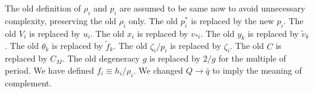 \documentclass{article}
\begin{document}
The old definition of $\rho_i$ and $p_i$ are assumed to be same now
to avoid unnecessary complexity, preserving the old $\rho_i$ only.
The old $p^*_i$ is replaced by the new $p_i$.
The old $V_i$ is replaced by $u_i$.
The old $x_i$ is replaced by $v_{*i}$.
The old $y_k$ is replaced by $\tilde v_k$.
The old $\theta_k$ is replaced by $\tilde f_k$.
The old $\zeta_i/p_i$ is replaced by $\zeta_i$.
The old $C$ is replaced by $C_M$.
The old degeneracy $g$ is replaced by $2/g$ for the multiple of period.
%
We have defined $f_i \equiv h_i/\rho_i$.
We changed $Q \to \bar q$ to imply the meaning of complement.
\end{document}
